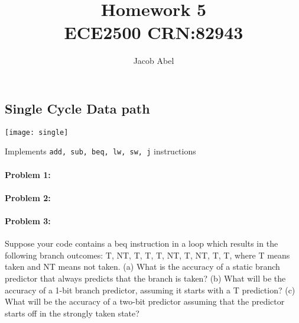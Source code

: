 \documentclass[12pt,letterpaper,titlepage]{article}
\author{Jacob Abel}
\title{	Homework 5
	\\\large ECE2500 CRN:82943
}
\begin{document}
\maketitle
\begin{raggedright}

\section{Single Cycle Data path}
\begin{center}
\texttt{[image: single]}

Implements \texttt{add, sub, beq, lw, sw, j} instructions
\end{center}

\clearpage

\paragraph{Problem 1: }


\clearpage
\paragraph{Problem 2: }

\clearpage
\paragraph{Problem 3: }
Suppose your code contains a beq instruction in a loop which results in the following branch outcomes: T, NT, T, T, T, NT, T, NT, T, T, where T means taken and NT means not taken. (a) What is the accuracy of a static branch predictor that always predicts that the branch is taken? (b) What will be the accuracy of a 1-bit branch predictor, assuming it starts with a T prediction? (c) What will be the accuracy of a two-bit predictor assuming that the predictor starts off in the strongly taken state?


\end{raggedright}
\end{document}
